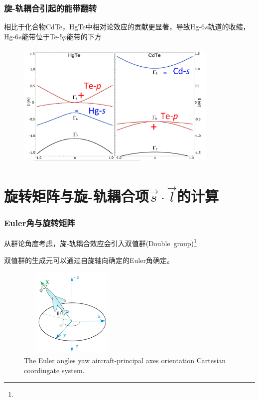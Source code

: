 \frame
{
	\frametitle{旋-轨耦合引起的能带翻转}
	相比于化合物\textrm{CdTe}，\textrm{HgTe}中相对论效应的贡献更显著，导致\textrm{Hg}-\textrm{6}$s$轨道的收缩，\textrm{Hg}-\textrm{6}$s$能带位于\textrm{Te}-\textrm{5}$p$能带的下方
	\begin{figure}[h!]
\centering
\vspace*{-0.05in}
\includegraphics[height=2.4in,width=3.80in,viewport=0 5 1350 830,clip]{Figures/SOC_double-group_2.png}
\label{Fig:Relativistic-Effect}
\end{figure}
}

\section{旋转矩阵与旋-轨耦合项$\vec s\cdot\vec l$的计算}
\frame
{
	\frametitle{\textrm{Euler}角与旋转矩阵}
	从群论角度考虑，旋-轨耦合效应会引入双值群\textrm{(Double~group)}\footnote{\fontsize{5.2pt}{6.2pt}}

	双值群的生成元可以通过自旋轴向确定的\textrm{Euler}角确定。

	{\fontsize{6.5pt}{4.2pt}}
	\begin{figure}[h!]
\centering
\vspace*{-0.21in}
\hspace*{-0.1in}
\includegraphics[height=1.7in,width=2.0in,viewport=2 5 1162 1180,clip]{Figures/euler-angles-yaw-aircraft-principal-axes-orientation-cartesian-coordinate-system.png}
\caption{\tiny \textrm{The Euler angles yaw aircraft-principal axes orientation Cartesian coordingate system.}}%
\label{Fig:Euler}
\end{figure}
}

